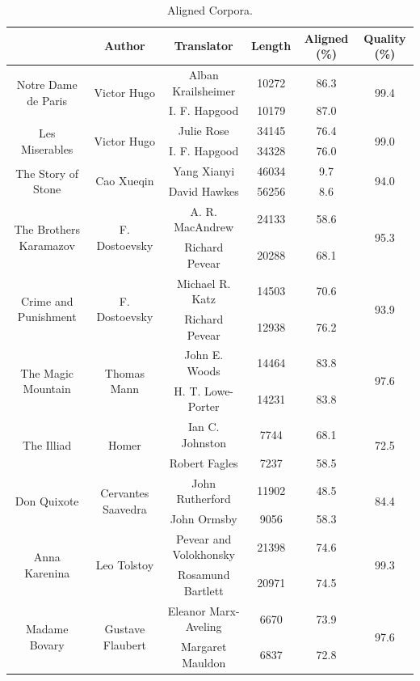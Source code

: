\documentclass[runningheads]{llncs}
\begin{document}
\begin{spacing}{1.1}
\begin{table}[h!]\footnotesize
	\centering
	\small
	\begin{tabular}{|c|c|c|c|c|c|}
		\hline
		\textbf{\diagbox{Corpus}{Information}} & \textbf{Author} & \textbf{Translator} & \textbf{Length} & \textbf{Aligned (\%)} & \textbf{Quality (\%)} \\
		\hline
		\hline
		\multirow{2}{*}{Notre Dame de Paris} & \multirow{2}{*}{Victor Hugo} & Alban Krailsheimer & 10272 & 86.3 & \multirow{2}{*}{99.4} \\
		\cline{3-5}
		& & I. F. Hapgood & 10179 & 87.0 & \\
		\hline
		\multirow{2}{*}{Les Miserables} & \multirow{2}{*}{Victor Hugo} & Julie Rose & 34145 & 76.4 & \multirow{2}{*}{99.0} \\
		\cline{3-5}
		& & I. F. Hapgood & 34328 & 76.0 & \\
		\hline
		\multirow{2}{*}{The Story of Stone} & \multirow{2}{*}{Cao Xueqin} & Yang Xianyi & 46034 & 9.7 & \multirow{2}{*}{94.0} \\
		\cline{3-5}
		& & David Hawkes & 56256 & 8.6 &  \\
		\hline
		\multirow{2}{*}{The Brothers Karamazov} & \multirow{2}{*}{F. Dostoevsky} & A. R. MacAndrew & 24133 & 58.6 & \multirow{2}{*}{95.3} \\
		\cline{3-5}
		& & Richard Pevear & 20288 & 68.1 & \\
		\hline
		\multirow{2}{*}{Crime and Punishment} & \multirow{2}{*}{F. Dostoevsky} & Michael R. Katz & 14503 & 70.6 & \multirow{2}{*}{93.9} \\
		\cline{3-5}
		& & Richard Pevear & 12938 & 76.2 & \\
		\hline
		\multirow{2}{*}{The Magic Mountain} & \multirow{2}{*}{Thomas Mann} & John E. Woods & 14464 & 83.8 & \multirow{2}{*}{97.6} \\
		\cline{3-5}
		& & H. T. Lowe-Porter & 14231 & 83.8 & \\
		\hline
		\multirow{2}{*}{The Illiad} & \multirow{2}{*}{Homer} & Ian C. Johnston & 7744 & 68.1 & \multirow{2}{*}{72.5} \\
		\cline{3-5}
		& & Robert Fagles & 7237 & 58.5 & \\
		\hline
		\multirow{2}{*}{Don Quixote} & \multirow{2}{*}{Cervantes Saavedra} & John Rutherford & 11902 & 48.5 & \multirow{2}{*}{84.4} \\
		\cline{3-5}
		& & John Ormsby & 9056 & 58.3 & \\
		\hline
		\multirow{2}{*}{Anna Karenina} & \multirow{2}{*}{Leo Tolstoy} & Pevear and Volokhonsky & 21398 & 74.6 & \multirow{2}{*}{99.3} \\
		\cline{3-5}
		& & Rosamund Bartlett & 20971 & 74.5 & \\
		\hline
		\multirow{2}{*}{Madame Bovary} & \multirow{2}{*}{Gustave Flaubert} & Eleanor Marx-Aveling & 6670 & 73.9 & \multirow{2}{*}{97.6} \\
		\cline{3-5}
		& & Margaret Mauldon & 6837 & 72.8 & \\
		\hline
	\end{tabular}
	\caption{Aligned Corpora.}\label{tb:6}
\end{table}


\end{spacing}
\end{document}
